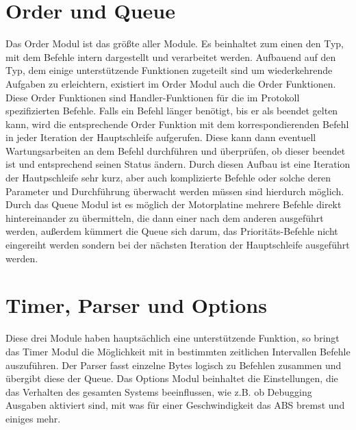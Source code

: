 \section{Order und Queue}
Das Order Modul ist das größte aller Module. Es beinhaltet zum einen den Typ, mit dem Befehle
intern dargestellt und verarbeitet werden. Aufbauend auf den Typ, dem einige unterstützende
Funktionen zugeteilt sind um wiederkehrende Aufgaben zu erleichtern, existiert im Order
Modul auch die Order Funktionen. Diese Order Funktionen sind Handler-Funktionen für die
im Protokoll spezifizierten Befehle. Falls ein Befehl länger benötigt, bis er als beendet
gelten kann, wird die entsprechende Order Funktion mit dem korrespondierenden Befehl in jeder
Iteration der Hauptschleife aufgerufen. Diese kann dann eventuell Wartungsarbeiten an dem
Befehl durchführen und überprüfen, ob dieser beendet ist und entsprechend seinen Status ändern.
Durch diesen Aufbau ist eine Iteration der Hautpschleife sehr kurz, aber auch komplizierte Befehle
oder solche deren Parameter und Durchführung überwacht werden müssen sind hierdurch möglich.\\
Durch das Queue Modul ist es möglich der Motorplatine mehrere Befehle direkt hintereinander
zu übermitteln, die dann einer nach dem anderen ausgeführt werden, außerdem kümmert die
Queue sich darum, das Prioritäts-Befehle nicht eingereiht werden sondern bei der nächsten
Iteration der Hauptschleife ausgeführt werden.
\section{Timer, Parser und Options}
Diese drei Module haben hauptsächlich eine unterstützende Funktion, so bringt das Timer Modul
die Möglichkeit mit in bestimmten zeitlichen Intervallen Befehle auszuführen. Der Parser
fasst einzelne Bytes logisch zu Befehlen zusammen und übergibt diese der Queue. Das Options
Modul beinhaltet die Einstellungen, die das Verhalten des gesamten Systems beeinflussen, wie
z.B. ob Debugging Ausgaben aktiviert sind, mit was für einer Geschwindigkeit das ABS bremst
und einiges mehr.
